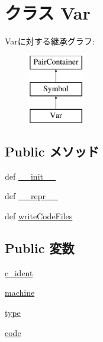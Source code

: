 \hypertarget{classslicc_1_1symbols_1_1Var_1_1Var}{
\section{クラス Var}
\label{classslicc_1_1symbols_1_1Var_1_1Var}
}
Varに対する継承グラフ:\begin{figure}[H]
\begin{center}
\leavevmode
\includegraphics[height=3cm]{classslicc_1_1symbols_1_1Var_1_1Var}
\end{center}
\end{figure}
\subsection*{Public メソッド}
\begin{DoxyCompactItemize}
\item 
def \hyperlink{classslicc_1_1symbols_1_1Var_1_1Var_ac775ee34451fdfa742b318538164070e}{\_\-\_\-init\_\-\_\-}
\item 
def \hyperlink{classslicc_1_1symbols_1_1Var_1_1Var_ad8b9328939df072e4740cd9a63189744}{\_\-\_\-repr\_\-\_\-}
\item 
def \hyperlink{classslicc_1_1symbols_1_1Var_1_1Var_a69d0582bde832d4ff45237ab5ff116bb}{writeCodeFiles}
\end{DoxyCompactItemize}
\subsection*{Public 変数}
\begin{DoxyCompactItemize}
\item 
\hyperlink{classslicc_1_1symbols_1_1Var_1_1Var_a4bbd0f8fedcfccc594b11a2023a02baf}{c\_\-ident}
\item 
\hyperlink{classslicc_1_1symbols_1_1Var_1_1Var_a6a9ee8dc9ee5944948c1b555462cbde0}{machine}
\item 
\hyperlink{classslicc_1_1symbols_1_1Var_1_1Var_a7aead736a07eaf25623ad7bfa1f0ee2d}{type}
\item 
\hyperlink{classslicc_1_1symbols_1_1Var_1_1Var_afb9ed1b8a27eb20854efe6e23e297683}{code}
\end{DoxyCompactItemize}



